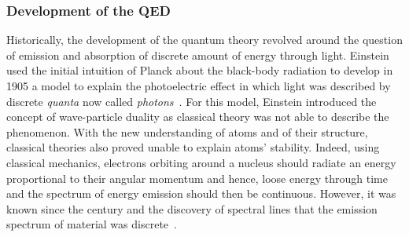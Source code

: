 	\subsubsection*{Development of the \acl{QED}}
	\label{chapt2:sssec:QED}
	
	Historically, the development of the quantum theory revolved around the question of emission and absorption of discrete amount of energy through light. Einstein used the initial intuition of Planck about the black-body radiation to develop in 1905 a model to explain the photoelectric effect in which light was described by discrete \textit{quanta} now called \textit{photons}~\cite{PLANK1900,EINSTEIN1905PHOTO}. For this model, Einstein introduced the concept of wave-particle duality as classical theory was not able to describe the phenomenon. With the new understanding of atoms and of their structure, classical theories also proved unable to explain atoms' stability. Indeed, using classical mechanics, electrons orbiting around a nucleus should radiate an energy proportional to their angular momentum and hence, loose energy through time and the spectrum of energy emission should then be continuous. However, it was known since the  century and the discovery of spectral lines that the emission spectrum of material was discrete~\cite{FRAUNHOFER1814}.
	
\begingroup\setlength{\intextsep}{0pt}\setlength{\columnsep}{15pt}
	
